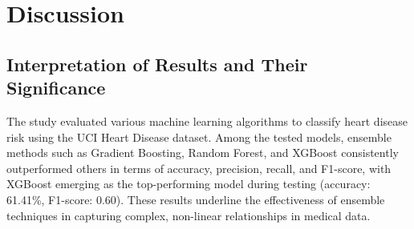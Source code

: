 \documentclass[pdflatex,sn-nature,Numbered]{sn-jnl}%
\theoremstyle{thmstyleone}%
\theoremstyle{thmstyletwo}%
\theoremstyle{thmstylethree}%
\begin{document}
\begin{table}[ht]
\centering
\hspace*{-1.5cm} %
\caption{Performance Comparison between all Machine Learning Models}
\label{table:result}

\end{table}

\section{Discussion}

\subsection{Interpretation of Results and Their Significance}
The study evaluated various machine learning algorithms to classify heart disease risk using the UCI Heart Disease dataset. Among the tested models, ensemble methods such as Gradient Boosting, Random Forest, and XGBoost consistently outperformed others in terms of accuracy, precision, recall, and F1-score, with XGBoost emerging as the top-performing model during testing (accuracy: 61.41\%, F1-score: 0.60). These results underline the effectiveness of ensemble techniques in capturing complex, non-linear relationships in medical data.
\end{document}
